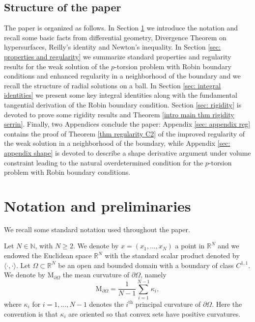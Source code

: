 \documentclass[10pt,a4paper]{amsart}
\numberwithin{equation}{section}
\newcommand{\R}{\mathbb{R}}
\newcommand{\N}{\mathbb{N}}
\begin{document}
\subsection{Structure of the paper}
The paper is organized as follows. In Section \ref{sec: notation} we introduce the notation and recall some basic facts from differential geometry, Divergence Theorem on hypersurfaces, Reilly's identity and Newton's inequality. In Section \ref{sec: properties and regularity} we summarize standard properties and regularity results for the weak solution of the $p$-torsion problem with Robin boundary conditions and enhanced regularity in a neighborhood of the boundary and we recall the structure of radial solutions on a ball. In Section \ref{sec: integral identities} we present some key integral identities along with the fundamental tangential derivation of the Robin boundary condition. Section \ref{sec: rigidity} is devoted to prove some rigidity results and Theorem \ref{intro main thm rigidity serrin}. Finally, two Appendices conclude the paper: Appendix \ref{sec: appendix reg} contains the proof of Theorem \ref{thm regularity C2} of the improved regularity of the weak solution in a neighborhood of the boundary, while Appendix \ref{sec: appendix shape} is devoted to describe a shape derivative argument under volume constraint leading to the natural overdetermined condition for the $p$-torsion problem with Robin boundary conditions.
 
\section{Notation and preliminaries} \label{sec: notation}

We recall some standard notation used throughout the paper. 

Let $N \in \N $, with $N\ge 2$. We denote by $x = (x_1,\dots,x_N)$ a point in $\R^N$ and we endowed the Euclidean space $\R^N$ with the standard scalar product denoted by $\langle \cdot,\cdot \rangle$. Let $\Omega \subset \R^N$ be an open and bounded domain with a boundary of class $C^{1,1}$. We denote by $\mathrm{M}_{\partial\Omega}$ the mean curvature of $\partial \Omega$, namely
\[
\mathrm{M}_{\partial\Omega}=\frac{1}{N-1} \sum_{i=1}^{N-1} \kappa_i,
\]
where $\kappa_i$ for $i=1, \dots,N-1$ denotes the $i^{\text{th}}$ principal curvature of $\partial \Omega$. Here the convention is that $\kappa_i$ are oriented so that convex sets have positive curvatures.
\end{document}
